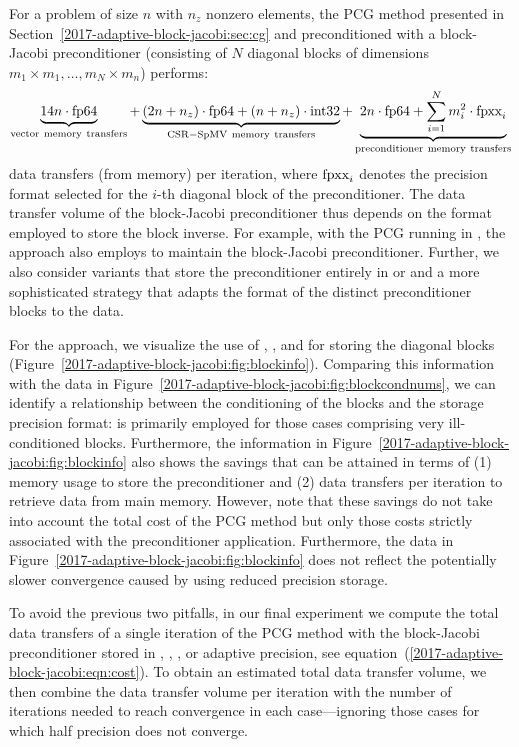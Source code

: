 For a problem of size $n$ with $n_z$ nonzero elements, the PCG method presented
in Section~\ref{2017-adaptive-block-jacobi:sec:cg} and preconditioned with a block-Jacobi preconditioner
(consisting of $N$ diagonal blocks of dimensions $m_1\times m_1,\ldots,m_N\times
m_n$) performs:
\begin{equation}
\label{2017-adaptive-block-jacobi:eqn:cost}
\underbrace{14 n \cdot \fpd}_\mathrm{vector\ memory\ transfers} + 
\underbrace{(2 n + n_z) \cdot \fpd + (n+n_z)\cdot \inti}_\mathrm{CSR-SpMV\ 
memory\ transfers} +
\underbrace{2 n \cdot \fpd +
\sum_{i=1}^{N} m_i^2 \cdot \fpv_i
}_\mathrm{preconditioner\ memory\ transfers}
\end{equation}
data transfers (from memory) per iteration, where $\mbox{\rm fpxx}_i$ denotes the precision
format selected for the $i$-th diagonal block of the preconditioner. The data
transfer volume of the block-Jacobi preconditioner thus depends on the format
employed to store the block inverse. For example, with the PCG running in \fpd, 
the approach also employs \fpd to maintain the
block-Jacobi preconditioner. Further, we also consider variants that store
the preconditioner entirely in \fps or \fph and a more sophisticated
strategy that adapts the format of the distinct preconditioner blocks to the
data.

For the \apbj approach, we visualize  the use of \fpd, \fps, and \fph for 
storing the diagonal blocks (Figure~\ref{2017-adaptive-block-jacobi:fig:blockinfo}). Comparing this 
information
with the data in Figure~\ref{2017-adaptive-block-jacobi:fig:blockcondnums}, we can identify a relationship
between the conditioning of the blocks and the storage precision format: \fpd 
is primarily employed for those cases comprising very ill-conditioned
blocks. Furthermore, the information in Figure~\ref{2017-adaptive-block-jacobi:fig:blockinfo} also
shows the savings that can be attained in terms of (1) memory usage
to store the preconditioner and (2) data transfers per iteration to retrieve 
data from main memory. However, note that these savings do not take into
account the total cost of the PCG method but only those costs strictly 
associated
with the preconditioner application. 
Furthermore, the data in Figure~\ref{2017-adaptive-block-jacobi:fig:blockinfo} does not reflect the
potentially slower convergence caused by using reduced precision storage.

To avoid the previous two pitfalls, in our final experiment we compute the total
data transfers of a single iteration of the PCG method with the block-Jacobi
preconditioner stored in \fpd, \fps, \fph, or adaptive precision, 
see equation~(\ref{2017-adaptive-block-jacobi:eqn:cost}). To obtain an estimated total data transfer 
volume,
we then combine the data transfer volume per iteration with the number of
iterations needed to reach convergence in each case---ignoring those cases for
which half precision does not converge.

